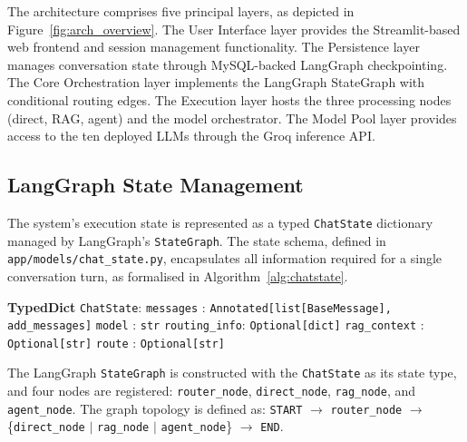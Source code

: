 \documentclass[12pt,a4paper]{article}
\newcommand{\kw}[1]{\textbf{#1}}
\newcommand{\ty}[1]{\texttt{#1}}
\begin{document}
The architecture comprises five principal layers, as depicted in Figure~\ref{fig:arch_overview}. The User Interface layer provides the Streamlit-based web frontend and session management functionality. The Persistence layer manages conversation state through MySQL-backed LangGraph checkpointing. The Core Orchestration layer implements the LangGraph StateGraph with conditional routing edges. The Execution layer hosts the three processing nodes (direct, RAG, agent) and the model orchestrator. The Model Pool layer provides access to the ten deployed LLMs through the Groq inference API.

\subsection{LangGraph State Management}

The system's execution state is represented as a typed \texttt{ChatState} dictionary managed by LangGraph's \texttt{StateGraph}. The state schema, defined in \texttt{app/models/chat\_state.py}, encapsulates all information required for a single conversation turn, as formalised in Algorithm~\ref{alg:chatstate}.

\begin{algorithm}[H]
\caption{ChatState TypedDict definition managing conversation context and routing metadata.}
\label{alg:chatstate}
\begin{algorithmic}[1]
  \State \kw{TypedDict} \ty{ChatState}:
  \State \hspace{\algorithmicindent}
         \ty{messages}     : \ty{Annotated[list[BaseMessage], add\_messages]}
  \State \hspace{\algorithmicindent}
         \ty{model}        : \ty{str}
  \State \hspace{\algorithmicindent}
         \ty{routing\_info}: \ty{Optional[dict]}
  \State \hspace{\algorithmicindent}
         \ty{rag\_context} : \ty{Optional[str]}
  \State \hspace{\algorithmicindent}
         \ty{route}        : \ty{Optional[str]}
\end{algorithmic}
\end{algorithm}

The LangGraph \texttt{StateGraph} is constructed with the \texttt{ChatState} as its state type, and four nodes are registered: \texttt{router\_node}, \texttt{direct\_node}, \texttt{rag\_node}, and \texttt{agent\_node}. The graph topology is defined as: \texttt{START} $\rightarrow$ \texttt{router\_node} $\rightarrow$ \{\texttt{direct\_node} $|$ \texttt{rag\_node} $|$ \texttt{agent\_node}\} $\rightarrow$ \texttt{END}.
\end{document}
